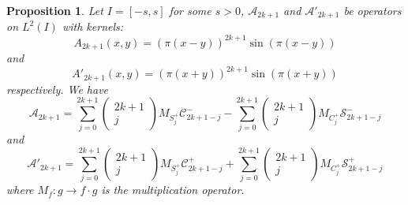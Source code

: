 \documentclass[10pt,a4paper]{amsart}
\newtheorem{proposition}{Proposition}
\begin{document}
\begin{proposition}\label{CUE fact}
Let $I=[-s,s]$ for some $s>0$, $\mathcal{A}_{2k+1}$ and $\mathcal{A}'_{2k+1}$ be operators on $L^2(I)$ with kernels:
\begin{equation*}
A_{2k+1}(x,y)=(\pi(x-y))^{2k+1}\sin(\pi(x-y))
\end{equation*}
and
\begin{equation*}
A'_{2k+1}(x,y)=(\pi(x+y))^{2k+1}\sin(\pi(x+y))
\end{equation*}
respectively.
We have
\begin{equation*}
\mathcal{A}_{2k+1}=\sum_{j=0}^{2k+1}\left(\begin{matrix}
    2k+1\\
    j
\end{matrix}\right)M_{S^+_{j}}\mathcal{C}^-_{2k+1-j}-\sum_{j=0}^{2k+1}\left(\begin{matrix}
    2k+1\\
    j
\end{matrix}\right)M_{C^+_{j}}\mathcal{S}^-_{2k+1-j}
\end{equation*}
and
\begin{equation*}
\mathcal{A}'_{2k+1}=\sum_{j=0}^{2k+1}\left(\begin{matrix}
    2k+1\\
    j
\end{matrix}\right)M_{S^+_{j}}\mathcal{C}^+_{2k+1-j}+\sum_{j=0}^{2k+1}\left(\begin{matrix}
    2k+1\\
    j
\end{matrix}\right)M_{C^+_{j}}\mathcal{S}^+_{2k+1-j}
\end{equation*}
where $M_f:g\rightarrow f\cdot g$ is the multiplication operator.
\end{proposition}
\end{document}
